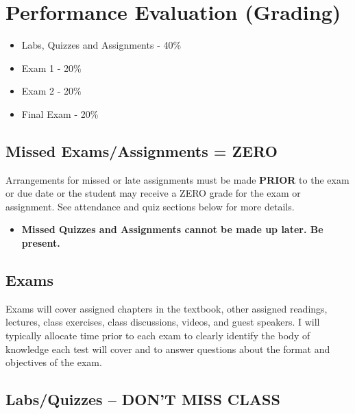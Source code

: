 \documentclass[
]{book}
\providecommand{\tightlist}{%
  \setlength{\itemsep}{0pt}\setlength{\parskip}{0pt}}
\begin{document}
\hypertarget{performance-evaluation-grading}{%
\section{Performance Evaluation (Grading)}\label{performance-evaluation-grading}}

\begin{itemize}
\tightlist
\item
  Labs, Quizzes and Assignments - 40\%
\item
  Exam 1 - 20\%
\item
  Exam 2 - 20\%
\item
  Final Exam - 20\%
\end{itemize}

\hypertarget{missed-examsassignments-zero}{%
\subsection{Missed Exams/Assignments = ZERO}\label{missed-examsassignments-zero}}

Arrangements for missed or late assignments must be made \textbf{PRIOR} to the exam or due date or the student may receive a ZERO grade for the exam or assignment. See attendance and quiz sections below for more details.

\begin{itemize}
\tightlist
\item
  \textbf{Missed Quizzes and Assignments cannot be made up later. Be present.}
\end{itemize}

\hypertarget{exams}{%
\subsection{Exams}\label{exams}}

Exams will cover assigned chapters in the textbook, other assigned readings, lectures, class exercises, class discussions, videos, and guest speakers. I will typically allocate time prior to each exam to clearly identify the body of knowledge each test will cover and to answer questions about the format and objectives of the exam.

\hypertarget{labsquizzes-dont-miss-class}{%
\subsection{\texorpdfstring{Labs/Quizzes -- \textbf{DON'T MISS CLASS}}{Labs/Quizzes -- DON'T MISS CLASS}}\label{labsquizzes-dont-miss-class}}
\end{document}
